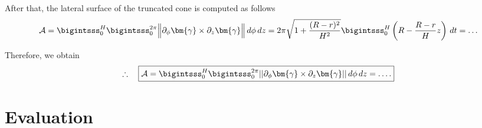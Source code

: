 \documentclass[12pt]{article}
\begin{document}
After that, the lateral surface of the truncated cone 
is computed as follows
\begin{align*}
	\mathcal{A}
	=
	\bigintsss_{0}^H \bigintsss_0^{2 \pi}
	\Big\| 
	\partial_{\phi} \bm{\gamma} \times \partial_z \bm{\gamma}
	\Big\|
	\, d\phi \, dz                            
	= 2 \pi \sqrt{1 + \frac{(R-r)^2}{H^2}}
	\bigintsss_{0}^H \left(R - \frac{R-r}{H}z\right) \, dt 
	= \dots
\end{align*}

Therefore, we obtain
\begin{align*}
	\therefore\quad\boxed{
		\mathcal{A} =
		\bigintsss_{0}^H \bigintsss_0^{2 \pi}
		||\partial_{\phi} \bm{\gamma} \times \partial_z \bm{\gamma} || \, d\phi \, dz
		= \dots.
	}
\end{align*}
\clearpage
\section{Evaluation}


% 
\end{document}
